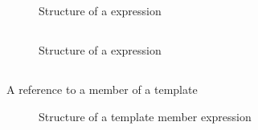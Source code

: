 

\subsection{}
\label{sec:ifc:ExprSort:Nullptr}

\begin{figure}[H]
	\centering
	\caption{Structure of a  expression}
	\label{fig:ifc-nullptr-expr-structure}
\end{figure}


\subsection{}
\label{sec:ifc:ExprSort:This}

\begin{figure}[H]
	\centering
	\caption{Structure of a  expression}
	\label{fig:ifc-this-expr-structure}
\end{figure}



\subsection{}
\label{sec:ifc:ExprSort:TemplateReference}

A reference to a member of a template
%
\begin{figure}[H]
	\centering
	\caption{Structure of a template member expression}
	\label{fig:ifc-member-template-expression-structure}
\end{figure}
%

